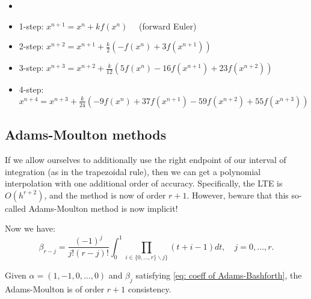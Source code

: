 \begin{example}
\label{eg: Explicit Adams-Bashforth methods}
\begin{itemize}
    \item []
    \item 1-step: $x^{n+1}=x^n+k f\left(x^n\right) \quad$ (forward Euler)
    \item 2-step: $x^{n+2}=x^{n+1}+\frac{k}{2}\left(-f\left(x^n\right)+3 f\left(x^{n+1}\right)\right)$
    \item 3-step: $x^{n+3}=x^{n+2}+\frac{k}{12}\left(5 f\left(x^n\right)-16 f\left(x^{n+1}\right)+23 f\left(x^{n+2}\right)\right)$
    \item 4-step: $ x^{n+4}=x^{n+3}+\frac{k}{24}\left(-9 f\left(x^n\right)+37 f\left(x^{n+1}\right)-59 f\left(x^{n+2}\right)+55 f\left(x^{n+3}\right)\right)$
\end{itemize}
\end{example}

\subsection{Adams-Moulton methods}
If we allow ourselves to additionally use the right endpoint of our interval of integration (as in the trapezoidal rule), then we can get a polynomial interpolation with one additional order of accuracy. Specifically, the LTE is $O\left(h^{r+2}\right)$, and the method is now of order $r+1$. However, beware that this so-called Adams-Moulton method is now implicit!

Now we have: 
\begin{equation}
\label{eq: coeff of Adams-Moulton methods}
\beta_{r-j}=\frac{(-1)^j}{j !(r-j) !} \int_0^1 \prod_{i \in\{0, \ldots, r\} \backslash j\}}(t+i-1) d t, \quad j=0, \ldots, r. 
\end{equation}


\begin{theorem}
    \label{thm: consistency of Adams-Bashforth}
    Given $ \alpha = (1,-1,0,\ldots ,0) $ and $ \beta _j $ satisfying \eqref{eq: coeff of Adams-Bashforth}, the Adams-Moulton is of order $ r+1 $ consistency. 
    \end{theorem}


